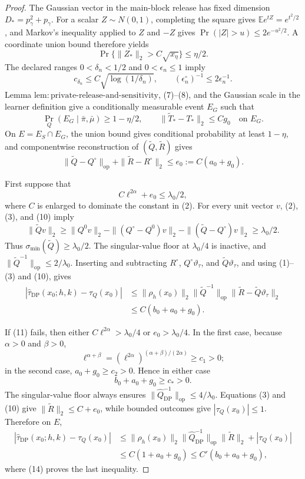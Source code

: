 \documentclass{article}
\begin{document}
\begin{proof}
The Gaussian vector in the main-block release has fixed dimension \(D_*=p_\gamma^2+p_\gamma\).  For a scalar \(Z\sim N(0,1)\), completing the square gives \(\mathbb Ee^{tZ}=e^{t^2/2}\), and Markov's inequality applied to \(Z\) and \(-Z\) gives \(\Pr(|Z|>u)\le2e^{-u^2/2}\).  A coordinate union bound therefore yields
\[
 \Pr\{\|Z_*\|_2>C\sqrt{x_\eta}\}\le\eta/2.
\tag{7}
\]
The declared ranges \(0<\delta_n<1/2\) and \(0<\epsilon_n\le1\) imply
\[
 c_{\delta_n}\le C\sqrt{\log(1/\delta_n)},
 \qquad (\epsilon_n^\circ)^{-1}\le2\epsilon_n^{-1}.
\tag{8}
\]
Lemma \(\mathrm{lem{:}private\text{-}release\text{-}and\text{-}sensitivity}\), (7)--(8), and the Gaussian scale in the learner definition give a conditionally measurable event \(E_G\) such that
\[
 \Pr_Q(E_G\mid\bar\pi,\bar\mu)\ge1-\eta/2,
 \qquad \|\widetilde T_*-T_*\|_2\le Cg_0
 \quad\text{on }E_G.
\tag{9}
\]
On \(E=E_S\cap E_G\), the union bound gives conditional probability at least \(1-\eta\), and componentwise reconstruction of \((\widetilde Q,\widetilde R)\) gives
\[
 \|\widetilde Q-Q^\circ\|_{\mathrm{op}}
 +\|\widetilde R-R^\circ\|_2
 \le e_0:=C(a_0+g_0).
\tag{10}
\]

First suppose that
\[
 C\ell^{2\alpha}+e_0\le\lambda_0/2,
\tag{11}
\]
where \(C\) is enlarged to dominate the constant in (2).  For every unit vector \(v\), (2), (3), and (10) imply
\[
 \|\widetilde Qv\|_2
 \ge\|Q^0v\|_2-\|(Q^\circ-Q^0)v\|_2
                    -\|(\widetilde Q-Q^\circ)v\|_2
 \ge\lambda_0/2.
\tag{12}
\]
Thus \(\sigma_{\min}(\widetilde Q)\ge\lambda_0/2\).  The singular-value floor at \(\lambda_0/4\) is inactive, and
\(\|\widetilde Q^{-1}\|_{\mathrm{op}}\le2/\lambda_0\).  Inserting and subtracting \(R^\circ\), \(Q^\circ\vartheta_\tau\), and \(\widetilde Q\vartheta_\tau\), and using (1)--(3) and (10), gives
\[
 \begin{aligned}
 |\widehat\tau_{\mathrm{DP}}(x_0;h,k)-\tau_Q(x_0)|
 &\le \|\rho_h(x_0)\|_2\|\widetilde Q^{-1}\|_{\mathrm{op}}
       \|\widetilde R-\widetilde Q\vartheta_\tau\|_2\\
 &\le C(b_0+a_0+g_0).
 \end{aligned}
\tag{13}
\]

If (11) fails, then either \(C\ell^{2\alpha}>\lambda_0/4\) or \(e_0>\lambda_0/4\).  In the first case, because \(\alpha>0\) and \(\beta>0\),
\[
 \ell^{\alpha+\beta}
 =(\ell^{2\alpha})^{(\alpha+\beta)/(2\alpha)}\ge c_1>0;
\]
in the second case, \(a_0+g_0\ge c_2>0\).  Hence in either case
\[
 b_0+a_0+g_0\ge c_*>0.
\tag{14}
\]
The singular-value floor always ensures \(\|\widehat Q_{\mathrm{DP}}^{-1}\|_{\mathrm{op}}\le4/\lambda_0\).  Equations (3) and (10) give \(\|\widetilde R\|_2\le C+e_0\), while bounded outcomes give \(|\tau_Q(x_0)|\le1\).  Therefore on \(E\),
\[
 \begin{aligned}
 |\widehat\tau_{\mathrm{DP}}(x_0;h,k)-\tau_Q(x_0)|
 &\le \|\rho_h(x_0)\|_2
       \|\widehat Q_{\mathrm{DP}}^{-1}\|_{\mathrm{op}}
       \|\widetilde R\|_2+|\tau_Q(x_0)|\\
 &\le C(1+a_0+g_0)
 \le C'(b_0+a_0+g_0),
 \end{aligned}
\tag{15}
\]
where (14) proves the last inequality.


\end{proof}
\end{document}
